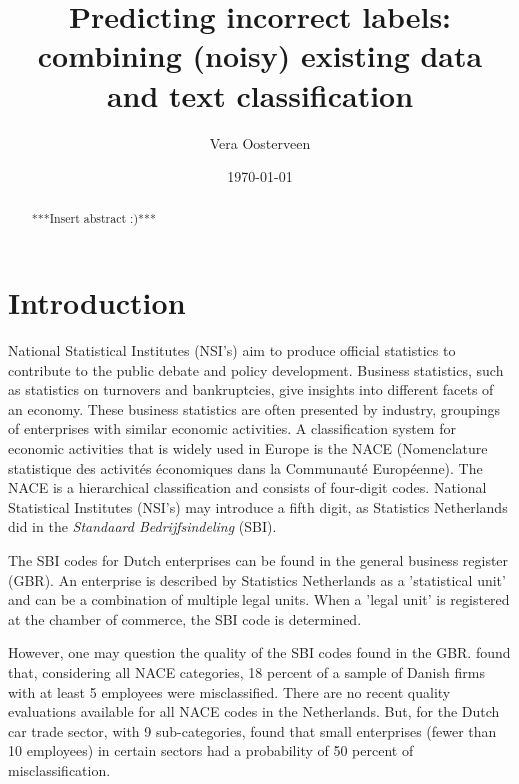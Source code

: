 \documentclass[12pt, a4paper, titlepage]{article}
\begin{document}
\title{Predicting incorrect labels: combining (noisy) existing data and text classification}
\author{Vera Oosterveen \\   }
\date{\today}
\maketitle

							\begin{abstract}
							***Insert abstract :)***
							\end{abstract}


							\section{Introduction}
							\label{section:intro}

National Statistical Institutes (NSI’s) aim to produce official statistics to contribute to the public debate and policy development. Business statistics, such as statistics on turnovers and bankruptcies, give insights into different facets of an economy. These business statistics are often presented by industry, groupings of enterprises with similar economic activities. A classification system for economic activities that is widely used in Europe is the NACE (Nomenclature statistique des activités économiques dans la Communauté Européenne). The NACE is a hierarchical classification and consists of four-digit codes. National Statistical Institutes (NSI’s) may introduce a fifth digit, as Statistics Netherlands did in the \textit{Standaard Bedrijfsindeling} (SBI).

The SBI codes for Dutch enterprises can be found in the general business register (GBR). An enterprise is described by Statistics Netherlands as a 'statistical unit' and can be a combination of multiple legal units. When a 'legal unit' is registered at the chamber of commerce, the SBI code is determined. 

However, one may question the quality of the SBI codes found in the GBR. \citet{Christensen2008} found that, considering all NACE categories, 18 percent of a sample of Danish firms with at least 5 employees were misclassified. There are no recent quality evaluations available for all NACE codes in the Netherlands. But, for the Dutch car trade sector, with 9 sub-categories, \citet{DeldenScholtusBurger} found that small enterprises (fewer than 10 employees) in certain sectors had a probability of 50 percent of misclassification.
\end{document}
